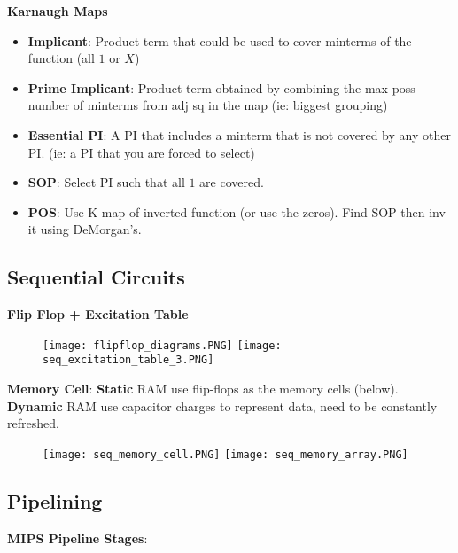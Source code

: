 \documentclass[a4paper,landscape]{article}
\newcommand{\rntopic}[1]{\vspace{-2.0em}\subsection*{#1}\vspace{-1.0em}}
\newcommand{\rnname}[1]{\textbf{#1}}
\begin{document}
\begin{multicols*}{4}
\begin{flatitemize}
\item \rnname{Karnaugh Maps}
\vspace{-0.5em}
\begin{itemize}
\item \textbf{Implicant}: Product term that could be used to cover minterms of the function (all $1$ or $X$)
\item \textbf{Prime Implicant}: Product term obtained by combining the max poss number of minterms from adj sq in the map (ie: biggest grouping)
\item \textbf{Essential PI}: A PI that includes a minterm that is not covered by any other PI. (ie: a PI that you are forced to select)
\item \textbf{SOP}: Select PI such that all $1$ are covered.
\item \textbf{POS}: Use K-map of inverted function (or use the zeros). Find SOP then inv it using DeMorgan's.
\end{itemize}
\end{flatitemize}
\rntopic{Sequential Circuits}
\begin{flatitemize}
\item \textbf{Flip Flop + Excitation Table}
\vspace{-1em}
\begin{figure}[H]
  \texttt{[image: flipflop\_diagrams.PNG]}
  \texttt{[image: seq\_excitation\_table\_3.PNG]}
\end{figure}
\vspace{-1.5em}
\item \textbf{Memory Cell}: \textbf{Static} RAM use flip-flops as the memory cells (below). \textbf{Dynamic} RAM use capacitor charges to represent data, need to be constantly refreshed.
\vspace{-1em}
\begin{figure}[H]
  \texttt{[image: seq\_memory\_cell.PNG]}
  \texttt{[image: seq\_memory\_array.PNG]}
\end{figure}
\vspace{-1.5em}
\end{flatitemize}


\rntopic{Pipelining}
\begin{flatitemize}

\item \rnname{MIPS Pipeline Stages}:


\end{flatitemize}
\end{multicols*}
\end{document}
